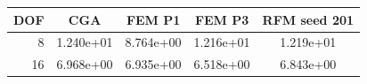 \begin{tabular}{rcccc}
\toprule
DOF & CGA & FEM P1 & FEM P3 & RFM seed 201 \\
\midrule
8 & 1.240e+01 & 8.764e+00 & 1.216e+01 & 1.219e+01 \\
16 & 6.968e+00 & 6.935e+00 & 6.518e+00 & 6.843e+00 \\
\bottomrule
\end{tabular}

